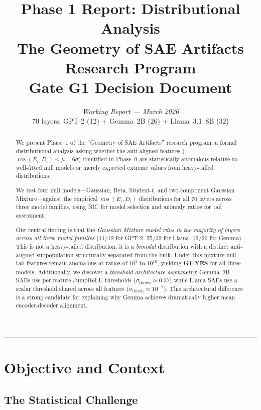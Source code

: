 \documentclass[11pt,a4paper]{article}
\title{\Large\bfseries Phase 1 Report: Distributional Analysis\\[0.5em]
\large The Geometry of SAE Artifacts Research Program\\[0.3em]
\normalsize Gate G1 Decision Document}
\author{\textit{Working Report --- March 2026}\\[0.3em]
\small 70 layers: GPT-2 (12) + Gemma~2B (26) + Llama~3.1~8B (32)}
\date{}
\newcommand{\cosED}{\cos(E_i, D_i)}
\begin{document}
\maketitle
\thispagestyle{fancy}

\begin{abstract}
\noindent We present Phase~1 of the ``Geometry of SAE Artifacts'' research program: a formal distributional analysis asking whether the anti-aligned features ($\cosED \leq \mu{-}6\sigma$) identified in Phase~0 are statistically anomalous relative to well-fitted null models or merely expected extreme values from heavy-tailed distributions.

We test four null models---Gaussian, Beta, Student-$t$, and two-component Gaussian Mixture---against the empirical $\cosED$ distributions for all 70 layers across three model families, using BIC for model selection and anomaly ratios for tail assessment.

Our central finding is that the \emph{Gaussian Mixture model wins in the majority of layers across all three model families} ($11/12$ for GPT-2, $25/32$ for Llama, $12/26$ for Gemma). This is not a heavy-tailed distribution: it is a \emph{bimodal} distribution with a distinct anti-aligned subpopulation structurally separated from the bulk. Under this mixture null, tail features remain anomalous at ratios of $10^3$ to $10^{10}$, yielding \textbf{G1-YES} for all three models. Additionally, we discover a \emph{threshold architecture asymmetry}: Gemma~2B SAEs use per-feature JumpReLU thresholds ($\sigma_\text{thresh}\approx 0.37$) while Llama SAEs use a scalar threshold shared across all features ($\sigma_\text{thresh}\approx 10^{-7}$). This architectural difference is a strong candidate for explaining why Gemma achieves dramatically higher mean encoder-decoder alignment.
\end{abstract}

\vspace{0.5em}\hrule\vspace{0.5em}
\tableofcontents
\newpage

\section{Objective and Context}
\label{sec:objective}

\subsection{The Statistical Challenge}
\end{document}

